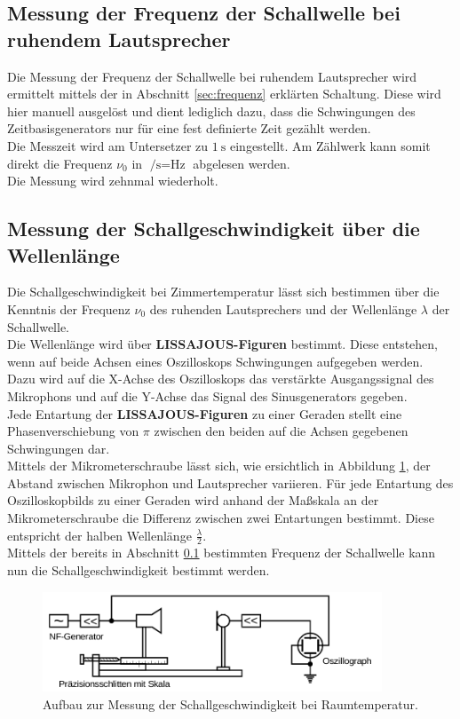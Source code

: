 \FloatBarrier
\subsection{Messung der Frequenz der Schallwelle bei ruhendem Lautsprecher}
\label{sec:schall} %
Die Messung der Frequenz der Schallwelle bei ruhendem Lautsprecher wird ermittelt mittels der in Abschnitt \ref{sec:frequenz} erklärten Schaltung.
Diese wird hier manuell ausgelöst und dient lediglich dazu, dass die Schwingungen des Zeitbasisgenerators nur für eine fest definierte Zeit gezählt werden.\\
Die Messzeit wird am Untersetzer zu $\SI{1}{\second}$ eingestellt. Am Zählwerk kann somit direkt die Frequenz $\nu_{\mathrm{0}}$ in $\si{\per\second}=\si{\Hz}$ abgelesen werden.\\
Die Messung wird zehnmal wiederholt.
\subsection{Messung der Schallgeschwindigkeit über die Wellenlänge}
Die Schallgeschwindigkeit bei Zimmertemperatur lässt sich bestimmen über die Kenntnis der Frequenz $\nu_{\mathrm{0}}$ des ruhenden Lautsprechers und der Wellenlänge $\lambda$ der Schallwelle.\\
Die Wellenlänge wird über \textbf{LISSAJOUS-Figuren} bestimmt.
Diese entstehen, wenn auf beide Achsen eines Oszilloskops Schwingungen aufgegeben werden. Dazu wird auf die X-Achse des Oszilloskops das verstärkte Ausgangssignal des Mikrophons und auf die Y-Achse das Signal des Sinusgenerators gegeben.\\
Jede Entartung der \textbf{LISSAJOUS-Figuren} zu einer Geraden stellt eine Phasenverschiebung von $\pi$ zwischen den beiden auf die Achsen gegebenen Schwingungen dar.\\
Mittels der Mikrometerschraube lässt sich, wie ersichtlich in Abbildung \ref{fig:lisa}, der Abstand zwischen Mikrophon und Lautsprecher variieren.
Für jede Entartung des Oszilloskopbilds zu einer Geraden wird anhand
der Maßskala an der Mikrometerschraube die Differenz zwischen zwei Entartungen bestimmt. Diese entspricht der halben Wellenlänge $\frac{\lambda}{2}$.\\
Mittels der bereits in Abschnitt \ref{sec:schall} bestimmten Frequenz der Schallwelle kann nun die Schallgeschwindigkeit bestimmt werden.

\begin{figure}
	\includegraphics[width=0.9\textwidth]{Bilder/lissajou.png}
	\caption{Aufbau zur Messung der Schallgeschwindigkeit bei Raumtemperatur. \cite{Anleitung}}
	\label{fig:lisa}
\end{figure}

